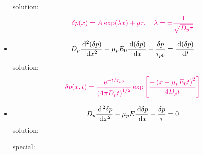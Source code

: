 \documentclass[a4paper, twocolumn]{article}
\begin{document}
\begin{itemize}
            solution:
            \begin{equation*}
                \color{magenta}
                \delta p(x) = A \exp(\lambda x) + g \tau, \quad \lambda = \pm \frac{1}{\sqrt{D_p \tau}} 
            \end{equation*}
        \item 
            \begin{equation*}
                D_p \frac{\: \mathrm{d}^2 (\delta p)}{\: \mathrm{d} x^2} - \mu_p E_0 \frac{\: \mathrm{d} (\delta p)}{\: \mathrm{d} x} - \frac{\delta p}{\tau_{p0}} = \frac{\: \mathrm{d} (\delta p)}{\: \mathrm{d} t}  
            \end{equation*}
            solution:
            \begin{equation*}
                \color{magenta}
                \delta p(x, t) = \frac{\mathrm{e}^{-t/\tau_{p0}} }{\left( 4 \pi D_p t \right)^{1/2}} \exp\left[ \frac{-\left(x - \mu_p E_0 t\right)^2}{4 D_p t}  \right]
            \end{equation*}
        \item 
            \begin{equation*}
                D_p \frac{\: \mathrm{d}^2 \delta p}{\: \mathrm{d} x^2} - \mu_p E \frac{\: \mathrm{d} \delta p}{\: \mathrm{d} x} - \frac{\delta p}{\tau} = 0 
            \end{equation*}
            solution: \\
            \begin{minipage}{\linewidth}
            \end{minipage}
            special:\\
            \begin{minipage}{\linewidth}
            \end{minipage}
    \end{itemize}
    
\end{document}
